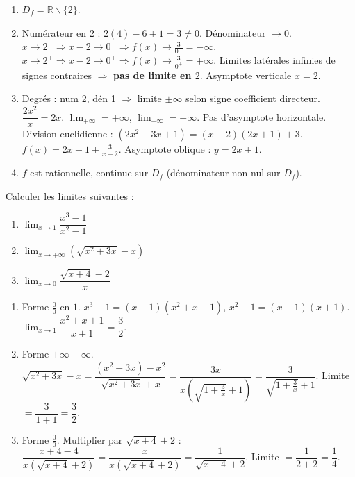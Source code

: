 \documentclass[11pt]{article}
\def\setminus{\mathbin{\backslash}}\let\smallsetminus\setminus
\begin{document}
\begin{corrige}[Exercice 1]
\begin{enumerate}
  \item $D_f = \mathbb{R}\setminus\{2\}$.
  \item Numérateur en $2$ : $2(4)-6+1=3\neq 0$. Dénominateur $\to 0$.
  $x\to 2^- \Rightarrow x-2\to 0^- \Rightarrow f(x)\to \frac{3}{0^-}=-\infty$.
  $x\to 2^+ \Rightarrow x-2\to 0^+ \Rightarrow f(x)\to \frac{3}{0^+}=+\infty$.
  Limites latérales infinies de signes contraires $\Rightarrow$ \textbf{pas de limite en $2$}. Asymptote verticale $x=2$.
  \item Degrés : num 2, dén 1 $\Rightarrow$ limite $\pm\infty$ selon signe coefficient directeur.
  $\dfrac{2x^2}{x}=2x$. $\lim_{+\infty}=+\infty$, $\lim_{-\infty}=-\infty$. Pas d'asymptote horizontale.
  Division euclidienne : $(2x^2-3x+1) = (x-2)(2x+1) + 3$.
  $f(x)=2x+1+\frac{3}{x-2}$. Asymptote oblique : $y=2x+1$.
  \item $f$ est rationnelle, continue sur $D_f$ (dénominateur non nul sur $D_f$).
\end{enumerate}
\end{corrige}

\begin{exercice}
Calculer les limites suivantes :
\begin{enumerate}
  \item $\lim_{x\to 1}\dfrac{x^3-1}{x^2-1}$
  \item $\lim_{x\to +\infty}\left(\sqrt{x^2+3x}-x\right)$
  \item $\lim_{x\to 0}\dfrac{\sqrt{x+4}-2}{x}$
\end{enumerate}
\end{exercice}

\begin{corrige}[Exercice 2]
\begin{enumerate}
  \item Forme $\frac{0}{0}$ en $1$.
  $x^3-1=(x-1)(x^2+x+1)$, $x^2-1=(x-1)(x+1)$.
  $\lim_{x\to 1}\dfrac{x^2+x+1}{x+1}=\dfrac{3}{2}$.
  \item Forme $+\infty-\infty$.
  $\sqrt{x^2+3x}-x = \dfrac{(x^2+3x)-x^2}{\sqrt{x^2+3x}+x} = \dfrac{3x}{x(\sqrt{1+\frac{3}{x}}+1)} = \dfrac{3}{\sqrt{1+\frac{3}{x}}+1}$.
  Limite $= \dfrac{3}{1+1}=\dfrac{3}{2}$.
  \item Forme $\frac{0}{0}$.
  Multiplier par $\sqrt{x+4}+2$ :
  $\dfrac{x+4-4}{x(\sqrt{x+4}+2)} = \dfrac{x}{x(\sqrt{x+4}+2)} = \dfrac{1}{\sqrt{x+4}+2}$.
  Limite $= \dfrac{1}{2+2}=\dfrac{1}{4}$.
\end{enumerate}
\end{corrige}
\end{document}
